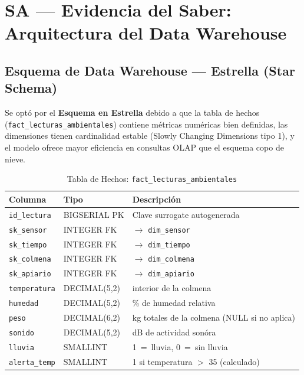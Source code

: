 \section{SA --- Evidencia del Saber: Arquitectura del Data Warehouse}

\subsection{Esquema de Data Warehouse --- Estrella (Star Schema)}

Se opt\'o por el \textbf{Esquema en Estrella} debido a que la tabla de hechos
(\texttt{fact\_lecturas\_ambientales}) contiene m\'etricas num\'ericas bien definidas,
las dimensiones tienen cardinalidad estable (Slowly Changing Dimensions tipo 1), y el
modelo ofrece mayor eficiencia en consultas OLAP que el esquema copo de nieve.

\begin{table}[h!]
  \centering
  \caption{Tabla de Hechos: \texttt{fact\_lecturas\_ambientales}}
  \begin{tabularx}{\textwidth}{llX}
    \toprule
    \textbf{Columna} & \textbf{Tipo} & \textbf{Descripci\'on} \\
    \midrule
    \texttt{id\_lectura}  & BIGSERIAL PK  & Clave surrogate autogenerada \\
    \texttt{sk\_sensor}   & INTEGER FK    & $\rightarrow$ \texttt{dim\_sensor} \\
    \texttt{sk\_tiempo}   & INTEGER FK    & $\rightarrow$ \texttt{dim\_tiempo} \\
    \texttt{sk\_colmena}  & INTEGER FK    & $\rightarrow$ \texttt{dim\_colmena} \\
    \texttt{sk\_apiario}  & INTEGER FK    & $\rightarrow$ \texttt{dim\_apiario} \\
    \texttt{temperatura}  & DECIMAL(5,2)  & \textcelsius{} interior de la colmena \\
    \texttt{humedad}      & DECIMAL(5,2)  & \% de humedad relativa \\
    \texttt{peso}         & DECIMAL(6,2)  & kg totales de la colmena (NULL si no aplica) \\
    \texttt{sonido}       & DECIMAL(5,2)  & dB de actividad son\'ora \\
    \texttt{lluvia}       & SMALLINT      & 1~=~lluvia, 0~=~sin lluvia \\
    \texttt{alerta\_temp} & SMALLINT      & 1 si temperatura $>$ 35\textcelsius{} (calculado) \\
    \bottomrule
  \end{tabularx}
\end{table}

